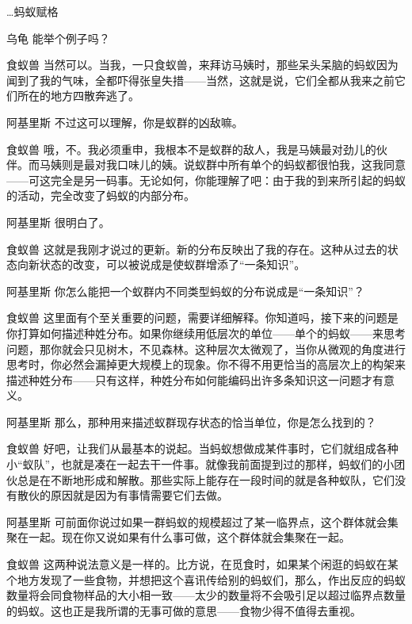 \begin{dialog}{…蚂蚁赋格}
\begin{dialogue}
\item[乌龟]能举个例子吗？

\item[食蚁兽]当然可以。当我，一只食蚁兽，来拜访马姨时，那些呆头呆脑的蚂蚁因为闻到了我的气味，全都吓得张皇失措——当然，这就是说，它们全都从我来之前它们所在的地方四散奔逃了。

\item[阿基里斯]不过这可以理解，你是蚁群的凶敌嘛。

\item[食蚁兽]哦，不。我必须重申，我根本不是蚁群的敌人，我是马姨最对劲儿的伙伴。而马姨则是最对我口味儿的姨。说蚁群中所有单个的蚂蚁都很怕我，这我同意——可这完全是另一码事。无论如何，你能理解了吧：由于我的到来所引起的蚂蚁的活动，完全改变了蚂蚁的内部分布。

\item[阿基里斯]很明白了。

\item[食蚁兽]这就是我刚才说过的更新。新的分布反映出了我的存在。这种从过去的状态向新状态的改变，可以被说成是使蚁群增添了“一条知识”。

\item[阿基里斯]你怎么能把一个蚁群内不同类型蚂蚁的分布说成是“一条知识”？

\item[食蚁兽]这里面有个至关重要的问题，需要详细解释。你知道吗，接下来的问题是你打算如何描述种姓分布。如果你继续用低层次的单位——单个的蚂蚁——来思考问题，那你就会只见树木，不见森林。这种层次太微观了，当你从微观的角度进行思考时，你必然会漏掉更大规模上的现象。你不得不用更恰当的高层次上的构架来描述种姓分布——只有这样，种姓分布如何能编码出许多条知识这一问题才有意义。

\item[阿基里斯]那么，那种用来描述蚁群现存状态的恰当单位，你是怎么找到的？

\item[食蚁兽]好吧，让我们从最基本的说起。当蚂蚁想做成某件事时，它们就组成各种小“蚁队”，也就是凑在一起去干一件事。就像我前面提到过的那样，蚂蚁们的小团伙总是在不断地形成和解散。那些实际上能存在一段时间的就是各种蚁队，它们没有散伙的原因就是因为有事情需要它们去做。

\item[阿基里斯]可前面你说过如果一群蚂蚁的规模超过了某一临界点，这个群体就会集聚在一起。现在你又说如果有什么事可做，这个群体就会集聚在一起。

\item[食蚁兽]这两种说法意义是一样的。比方说，在觅食时，如果某个闲逛的蚂蚁在某个地方发现了一些食物，并想把这个喜讯传给别的蚂蚁们，那么，作出反应的蚂蚁数量将会同食物样品的大小相一致——太少的数量将不会吸引足以超过临界点数量的蚂蚁。这也正是我所谓的无事可做的意思——食物少得不值得去重视。


\end{dialogue}
\end{dialog}
